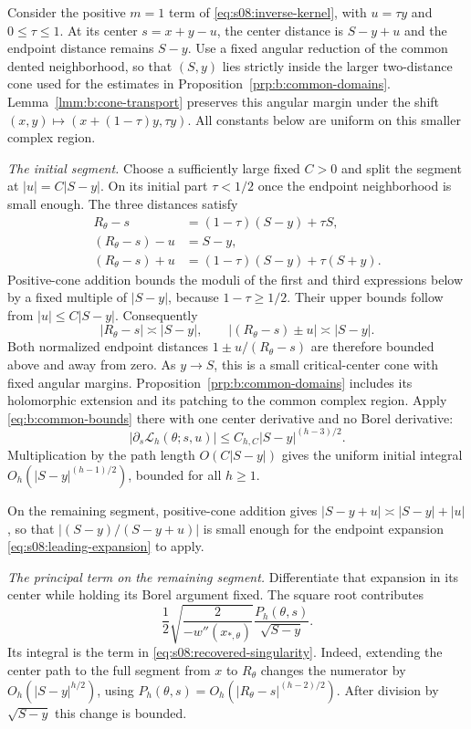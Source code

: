 \begin{prf}
Consider the positive $m=1$ term of
\eqref{eq:s08:inverse-kernel}, with $u=\tau y$ and $0\leq\tau\leq1$.
At its center $s=x+y-u$, the center distance is $S-y+u$
and the endpoint distance remains $S-y$. Use a fixed angular
reduction of the common dented neighborhood, so that $(S,y)$ lies
strictly inside the larger two-distance cone used for the estimates
in Proposition~\ref{prp:b:common-domains}.
Lemma~\ref{lmm:b:cone-transport} preserves this angular margin
under the shift $(x,y)\mapsto(x+(1-\tau)y,\tau y)$.
All constants below are uniform on this smaller complex region.

\smallskip\noindent
\emph{The initial segment.}
Choose a sufficiently large fixed $C>0$ and split the segment at
$|u|=C|S-y|$. On its initial part $\tau<1/2$ once the endpoint
neighborhood is small enough. The three distances satisfy
\[
 \begin{aligned}
 R_\theta-s&=(1-\tau)(S-y)+\tau S,\\
 (R_\theta-s)-u&=S-y,\\
 (R_\theta-s)+u&=(1-\tau)(S-y)+\tau(S+y).
 \end{aligned}
\]
Positive-cone addition bounds the moduli of the first and third
expressions below by a fixed multiple of $|S-y|$, because
$1-\tau\geq1/2$. Their upper bounds follow from
$|u|\leq C|S-y|$. Consequently
\[
 |R_\theta-s|\asymp |S-y|,\qquad
 |(R_\theta-s)\pm u|\asymp |S-y|.
\]
Both normalized endpoint distances $1\pm u/(R_\theta-s)$
are therefore bounded above and away from zero.
As $y\to S$, this is a small critical-center cone with fixed
angular margins. Proposition~\ref{prp:b:common-domains} includes
its holomorphic extension and its patching to the common complex
region. Apply \eqref{eq:b:common-bounds} there with one center
derivative and no Borel derivative:
\[
 |\partial_s\mathcal L_h(\theta;s,u)|
       \leq C_{h,C}|S-y|^{(h-3)/2}.
\]
Multiplication by the path length $O(C|S-y|)$ gives the uniform
initial integral $O_h(|S-y|^{(h-1)/2})$, bounded for all $h\geq1$.

On the remaining segment, positive-cone addition gives
$|S-y+u|\asymp |S-y|+|u|$, so that
$|(S-y)/(S-y+u)|$ is small enough for
the endpoint expansion \eqref{eq:s08:leading-expansion} to apply.

\smallskip\noindent
\emph{The principal term on the remaining segment.}
Differentiate that expansion in its center while holding its Borel
argument fixed. The square root contributes
\[
 \frac12\sqrt{\frac{2}{-w''(x_{*,\theta})}}
               \frac{P_h(\theta,s)}{\sqrt{S-y}}.
\]
Its integral is the term in \eqref{eq:s08:recovered-singularity}.
Indeed, extending the center path to the full segment from $x$ to
$R_\theta$ changes the numerator by
$O_h(|S-y|^{h/2})$, using
$P_h(\theta,s)=O_h(|R_\theta-s|^{(h-2)/2})$.
After division by $\sqrt{S-y}$ this change is bounded.


\end{prf}
